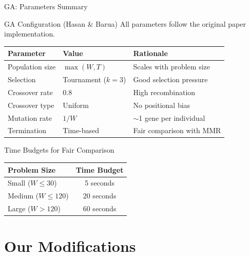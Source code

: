 \documentclass[aspectratio=43,8pt]{beamer}
\begin{document}
\begin{frame}{GA: Parameters Summary}
\begin{block}{GA Configuration (Hasan \& Barua)}
All parameters follow the original paper implementation.
\end{block}

\vspace{0.3cm}
\begin{table}[h]
\centering
\begin{tabular}{lll}
\toprule
\textbf{Parameter} & \textbf{Value} & \textbf{Rationale} \\
\midrule
Population size & $\max(W, T)$ & Scales with problem size \\
Selection & Tournament ($k=3$) & Good selection pressure \\
Crossover rate & 0.8 & High recombination \\
Crossover type & Uniform & No positional bias \\
Mutation rate & $1/W$ & $\sim$1 gene per individual \\
Termination & Time-based & Fair comparison with MMR \\
\bottomrule
\end{tabular}
\end{table}

\vspace{0.2cm}
\begin{alertblock}{Time Budgets for Fair Comparison}
\begin{center}
\begin{tabular}{lc}
\toprule
\textbf{Problem Size} & \textbf{Time Budget} \\
\midrule
Small ($W \leq 30$) & 5 seconds \\
Medium ($W \leq 120$) & 20 seconds \\
Large ($W > 120$) & 60 seconds \\
\bottomrule
\end{tabular}
\end{center}
\end{alertblock}
\end{frame}

\section{Our Modifications}
\end{document}
